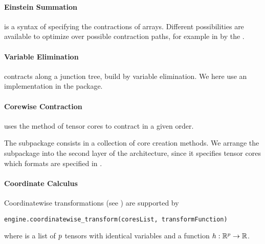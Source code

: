 \paragraph{Einstein Summation}
is a syntax of specifying the contractions of arrays.
Different possibilities are available to optimize over possible contraction paths, for example in  by the .

\paragraph{Variable Elimination}
contracts along a junction tree, build by variable elimination.
We here use an implementation in the  package.

\paragraph{Corewise Contraction}
uses the  method of tensor cores to contract in a given order.





\label{sec:implementationRepresentation}

The \sprepresentation{} subpackage consists in a collection of core creation methods.
We arrange the \sprepresentation{} subpackage into the second layer of the \tnreason{} architecture, since it specifies tensor cores which formats are specified in \spengine{}.

\paragraph{Coordinate Calculus}
Coordinatewise transformations (see ) are supported by
\begin{lstlisting}
engine.coordinatewise_transform(coresList, transformFunction)
\end{lstlisting}
where  is a list of $p$ tensors with identical variables and  a function $h: \mathbb{R}^{p} \rightarrow \mathbb{R}$.

